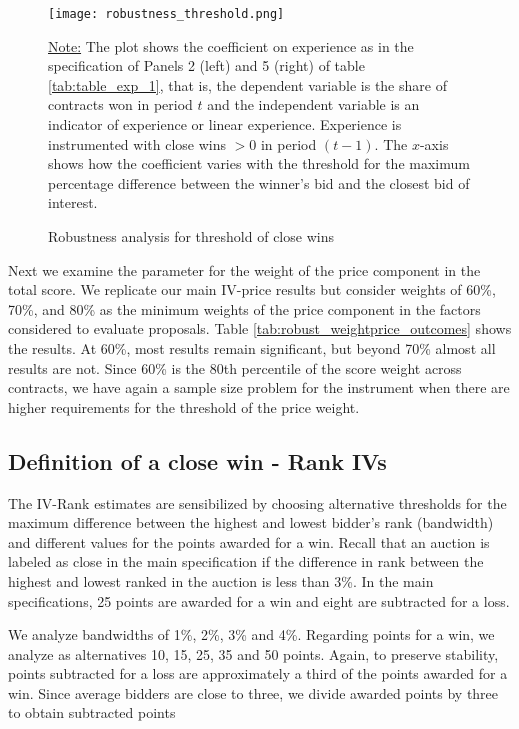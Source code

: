  \begin{figure}[H]
         \centering
         \texttt{[image: robustness\_threshold.png]}
         \caption{Robustness analysis for threshold of close wins}
         \label{fig:close_wins_robust}

  \vskip 0.5mm
  {\noindent \justifying\footnotesize\underline {Note:} The plot shows the coefficient on experience as in the specification of Panels 2 (left) and 5 (right) of table \ref{tab:table_exp_1}, that is, the dependent variable is the share of contracts won in period $t$ and the independent variable is an indicator of experience or linear experience. Experience is instrumented with close wins $> 0$ in period $(t-1)$. The $x$-axis shows how the coefficient varies with the threshold for the maximum percentage difference between the winner's bid and the closest bid of interest.\par}
 \end{figure}

Next we examine the parameter for the weight of the price component in the total score. We replicate our main IV-price results but consider weights  of 60\%, 70\%, and 80\% as the minimum weights of the price component in the factors considered to evaluate proposals. Table \ref{tab:robust_weightprice_outcomes} shows the results. At 60\%, most results remain significant, but beyond 70\% almost all results are not. Since 60\% is the 80th percentile of the score weight across contracts, we have again a sample size problem for the instrument when there are higher requirements for the threshold of the price weight.



\subsection{Definition of a close win - Rank IVs}
The IV-Rank estimates are sensibilized by choosing alternative thresholds for the maximum difference between the highest and lowest bidder's rank (bandwidth) and different values for the points awarded for a win. Recall that an auction is labeled as close in the main specification if the difference in rank between the highest and lowest ranked in the auction is less than 3\%. In the main specifications, 25 points are awarded for a win and eight are subtracted for a loss.

We analyze bandwidths of 1\%, 2\%, 3\% and 4\%. Regarding points for a win, we analyze as alternatives 10, 15, 25, 35 and 50 points. Again, to preserve stability, points subtracted for a loss are approximately a third of the points awarded for a win. Since average bidders are close to three, we divide awarded points by three to obtain subtracted points

